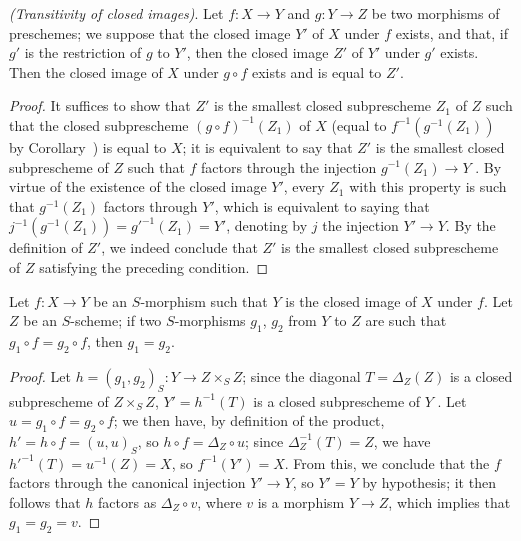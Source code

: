 \begin{proposition}[9.5.5]
\label{I.9.5.5}
\emph{(Transitivity of closed images)}. Let $f:X\to Y$ and $g:Y\to Z$ be two morphisms of
preschemes; we suppose that the closed image $Y'$ of $X$ under $f$ exists, and that, if $g'$
is the restriction of $g$ to $Y'$, then the closed image $Z'$ of $Y'$ under $g'$ exists. Then
the closed image of $X$ under $g\circ f$ exists and is equal to $Z'$.
\end{proposition}

\begin{proof}
It suffices  to show that $Z'$ is the smallest closed
subprescheme $Z_1$ of $Z$ such that the closed subprescheme $(g\circ f)^{-1}(Z_1)$ of $X$
(equal to $f^{-1}(g^{-1}(Z_1))$ by Corollary~) is equal to
$X$; it is equivalent to say that $Z'$ is the smallest closed subprescheme of $Z$ such that
$f$ factors through the injection $g^{-1}(Z_1)\to Y$ . By
virtue of the existence of the closed image $Y'$, every $Z_1$ with this property is such
that $g^{-1}(Z_1)$ factors through $Y'$, which is equivalent to saying that $j^{-1}(g^{-1}(Z_1))=g'^{-1}(Z_1)=Y'$, denoting by $j$ the injection $Y'\to Y$.
By the definition of $Z'$, we indeed conclude that $Z'$ is the smallest closed
subprescheme of $Z$ satisfying the preceding condition.
\end{proof}

\begin{corollary}[9.5.6]
\label{I.9.5.6}
Let $f:X\to Y$ be an $S$-morphism such that $Y$ is the closed image of $X$ under $f$.
Let $Z$ be an $S$-scheme; if two $S$-morphisms $g_1$, $g_2$ from $Y$ to $Z$ are such that $g_1\circ f=g_2\circ f$, then $g_1=g_2$.
\end{corollary}

\begin{proof}
Let $h=(g_1,g_2)_S:Y\to Z\times_S Z$; since the diagonal $T=\Delta_Z(Z)$ is a closed subprescheme of $Z\times_S Z$, $Y'=h^{-1}(T)$ is a closed subprescheme of $Y$ .
Let $u=g_1\circ f=g_2\circ f$; we then have, by definition of the product, $h'=h\circ f=(u,u)_S$, so $h\circ f=\Delta_Z\circ u$; since $\Delta_Z^{-1}(T)=Z$, we have $h'^{-1}(T)=u^{-1}(Z)=X$, so $f^{-1}(Y')=X$.
From this, we conclude  that the $f$ factors through the canonical injection $Y'\to Y$, so $Y'=Y$ by hypothesis; it then follows  that $h$ factors as $\Delta_Z\circ v$, where $v$ is a morphism $Y\to Z$, which implies that $g_1=g_2=v$.
\end{proof}

